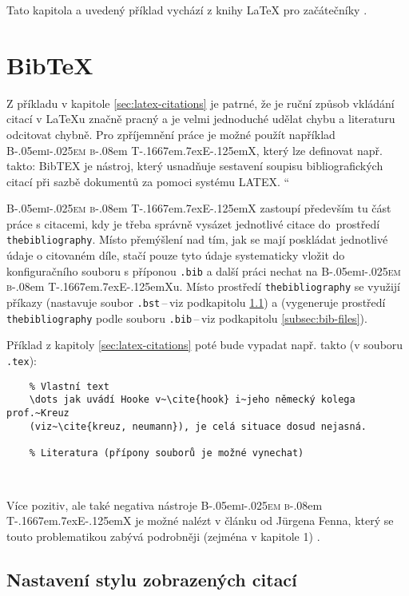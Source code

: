 \documentclass[a4paper, 11pt, final]{article}
\providecommand{\uv}[1]{\quotedblbase #1 \textquotedblleft}
\def\BibTeX{\textrm{B\kern-.05em\textsc{i\kern-.025em b}\kern-.08em T\kern-.1667em\lower.7ex\hbox{E}\kern-.125emX}}
\begin{document}
Tato kapitola a uvedený příklad vychází z knihy \LaTeX{} pro začátečníky \cite{rybicka-latex}.

\section{BibTeX}

Z příkladu v kapitole \ref{sec:latex-citations} je patrné, že je ruční způsob vkládání citací v \LaTeX{}u
značně pracný a je velmi jednoduché udělat chybu a literaturu odcitovat chybně. Pro zpříjemnění práce je
možné použít například \BibTeX{}, který lze definovat např. takto: \uv{BibTEX je nástroj, který usnadňuje
sestavení soupisu bibliografických citací při sazbě dokumentů za pomoci systému LATEX.} \cite{pysny-plaincz}

\BibTeX{} zastoupí především tu část práce s citacemi, kdy je třeba správně vysázet jednotlivé citace
do~prostředí \texttt{thebibliography}. Místo přemýšlení nad tím, jak se mají poskládat jednotlivé údaje
o citovaném díle, stačí pouze tyto údaje systematicky vložit do konfiguračního souboru s příponou
\texttt{.bib} a další práci nechat na \BibTeX{}u. Místo prostředí \texttt{thebibliography} se využijí
příkazy \verb|| (nastavuje soubor \texttt{.bst}\,--\,viz podkapitolu
\ref{subsec:sty-files}) a \verb|| (vygeneruje prostředí \texttt{thebibliography} podle
souboru \texttt{.bib}\,--\,viz podkapitolu \ref{subsec:bib-files}). \cite{pysny-plaincz, patashnik-bibtexing}

Příklad z kapitoly \ref{sec:latex-citations} poté bude vypadat např. takto (v souboru \texttt{.tex}):

\begin{verbatim}
    % Vlastní text
    \dots jak uvádí Hooke v~\cite{hook} i~jeho německý kolega prof.~Kreuz
    (viz~\cite{kreuz, neumann}), je celá situace dosud nejasná.
    
    % Literatura (přípony souborů je možné vynechat)
    
    
\end{verbatim}

Více pozitiv, ale také negativa nástroje \BibTeX{} je možné nalézt v článku od J\"{u}rgena Fenna, který
se touto problematikou zabývá podrobněji (zejména v kapitole 1) \cite{fenn-managing-citations}.

\subsection{Nastavení stylu zobrazených citací}
\label{subsec:sty-files}
\end{document}
